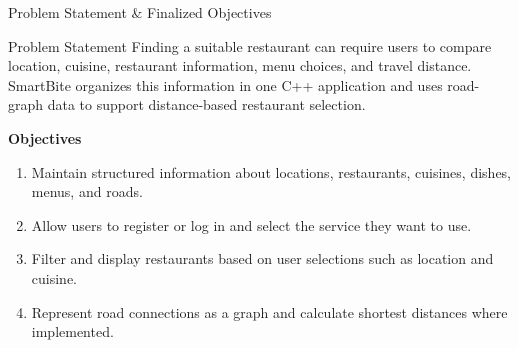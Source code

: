 \documentclass[aspectratio=169,10pt]{beamer}
\begin{document}
\begin{frame}{Problem Statement \& Finalized Objectives}
\begin{block}{Problem Statement}
Finding a suitable restaurant can require users to compare location, cuisine, restaurant information, menu choices, and travel distance. SmartBite organizes this information in one C++ application and uses road-graph data to support distance-based restaurant selection.
\end{block}
\textbf{\color{GEUBlue}Objectives}
\begin{enumerate}\itemsep2pt
\item Maintain structured information about locations, restaurants, cuisines, dishes, menus, and roads.
\item Allow users to register or log in and select the service they want to use.
\item Filter and display restaurants based on user selections such as location and cuisine.
\item Represent road connections as a graph and calculate shortest distances where implemented.
\end{enumerate}

\end{frame}
\end{document}
